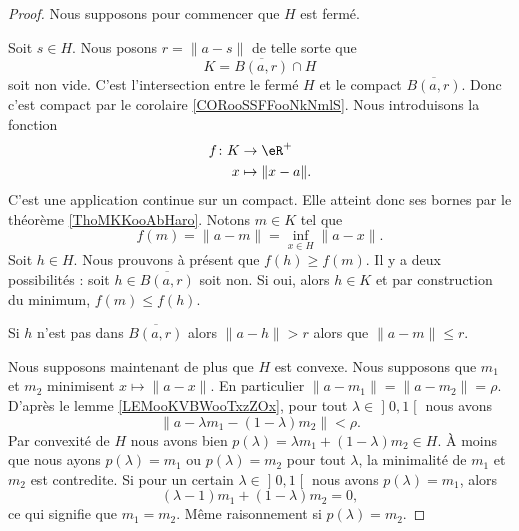 \begin{proof}
	Nous supposons pour commencer que \( H\) est fermé.

	\begin{subproof}
		\spitem[La partie \( K\)]
		Soit \( s\in H\). Nous posons \( r=\| a-s \|\) de telle sorte que
		\begin{equation}
			K=\overline{B(a,r)}\cap H
		\end{equation}
		soit non vide.
		C'est l'intersection entre le fermé \( H\) et le compact \( \overline{B(a,r)}\). Donc c'est compact par le corolaire \ref{CORooSSFFooNkNmlS}.
		\spitem[La fonction \( f\)]
		Nous introduisons la fonction
		\begin{equation}
			\begin{aligned}
				f\colon K & \to \eR^+          \\
				x         & \mapsto \| x-a \|.
			\end{aligned}
		\end{equation}
		C'est une application continue sur un compact. Elle atteint donc ses bornes par le théorème \ref{ThoMKKooAbHaro}. Notons \( m\in K\) tel que
		\begin{equation}
			f(m)=\| a-m \|=\inf_{x\in H}\| a-x \|.
		\end{equation}
		Soit \( h\in H\). Nous prouvons à présent que \( f(h)\geq f(m)\). Il y a deux possibilités : soit \( h\in \overline{B(a,r)}\) soit non. Si oui, alors \( h\in K\) et par construction du minimum, \( f(m)\leq f(h)\).

		Si \( h\) n'est pas dans \( \overline{B(a,r)}\) alors \( \| a-h \|>r\) alors que \( \| a-m \|\leq r\).
	\end{subproof}

	Nous supposons maintenant de plus que \( H\) est convexe. Nous supposons que \( m_1\) et \( m_2\) minimisent \( x\mapsto \| a-x \|\). En particulier \( \| a-m_1 \|=\| a-m_2 \|=\rho\). D'après le lemme \ref{LEMooKVBWooTxzZOx}, pour tout \( \lambda\in \mathopen] 0,1\mathclose[\) nous avons
		\begin{equation}
			\| a-\lambda m_1-(1-\lambda)m_2 \|<\rho.
		\end{equation}
		Par convexité de \( H\) nous avons bien \( p(\lambda)=\lambda m_1+(1-\lambda)m_2\in H\). À moins que nous ayons \( p(\lambda)=m_1 \) ou \( p(\lambda)=m_2\) pour tout \( \lambda\), la minimalité de \( m_1\) et \( m_2\) est contredite. Si pour un certain \( \lambda\in \mathopen]0 ,1\mathclose[\) nous avons \( p(\lambda)=m_1\), alors
	\begin{equation}
		(\lambda-1)m_1+(1-\lambda)m_2=0,
	\end{equation}
	ce qui signifie que \( m_1=m_2\). Même raisonnement si \( p(\lambda)=m_2\).
\end{proof}

